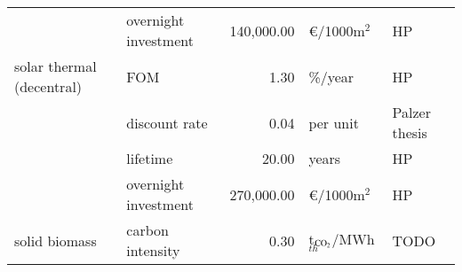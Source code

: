\begin{longtable}{p{4cm}p{4cm}rp{3cm}p{10cm}}
                      & overnight investment &   140,000.00 &               \euro/1000m$^2$ &                                                                                                                                                                                                                                                                                                                                   HP \\
solar thermal (decentral) & FOM &         1.30 &                       \%/year &                                                                                                                                                                                                                                                                                                                                   HP \\
                      & discount rate &         0.04 &                      per unit &                                                                                                                                                                                                                                                                                                                        Palzer thesis \\
                      & lifetime &        20.00 &                         years &                                                                                                                                                                                                                                                                                                                                   HP \\
                      & overnight investment &   270,000.00 &               \euro/1000m$^2$ &                                                                                                                                                                                                                                                                                                                                   HP \\
solid biomass & carbon intensity &         0.30 &     t$_{\ce{CO2}}$/MWh$_{th}$ &                                                                                                                                                                                                                                                                                                                                 TODO \\

\end{longtable}

